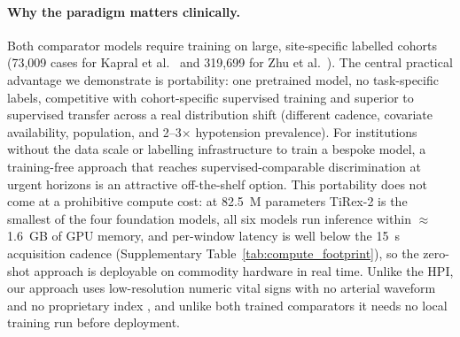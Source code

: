 \documentclass[11pt]{article}
\begin{document}
\paragraph{Why the paradigm matters clinically.} Both comparator models require training
on large, site-specific labelled cohorts (73{,}009 cases for Kapral et al.\
\citep{Kapral2024} and 319{,}699 for Zhu et al.\ \citep{Zhu2026}). The
central practical advantage we demonstrate is portability: one pretrained
model, no task-specific labels, competitive with cohort-specific supervised
training and superior to supervised transfer across a real distribution
shift (different cadence, covariate availability, population, and
2--3$\times$ hypotension prevalence). For institutions without the data
scale or labelling infrastructure to train a bespoke model, a training-free
approach that reaches supervised-comparable discrimination at urgent
horizons is an attractive off-the-shelf option. This portability does not
come at a prohibitive compute cost: at 82.5~M parameters TiRex-2 is the
smallest of the four foundation models, all six models run inference within
$\approx$1.6~GB of GPU memory, and per-window latency is well below the 15~s
acquisition cadence (Supplementary Table~\ref{tab:compute_footprint}), so the
zero-shot approach is deployable on commodity hardware in real time. Unlike
the HPI, our approach uses low-resolution numeric vital signs with no
arterial waveform and no proprietary index
\citep{Hatib2018,Enevoldsen2022,Vistisen2024}, and unlike both trained
comparators it needs no local training run before deployment.
\end{document}
